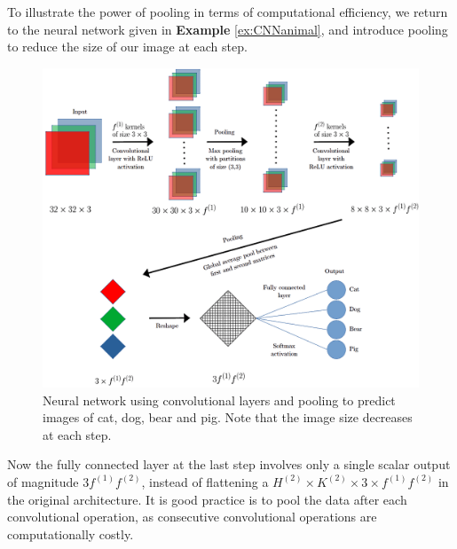 \begin{example}
To illustrate the power of pooling in terms of computational efficiency, we return to the neural network given in \textbf{Example} \ref{ex:CNNanimal}, and introduce pooling to reduce the size of our image at each step.
  \begin{figure}[H]
    \centering
    \includegraphics[scale=0.35]{images/Chapter 11/poolingNetwork.png}
    \caption{Neural network using convolutional layers and pooling to predict images of cat, dog, bear and pig. Note that the image size decreases at each step.}
    \label{fig:11.1}
\end{figure}
\noindent Now the fully connected layer at the last step involves only a single scalar output of magnitude $3f^{(1)}f^{(2)}$, instead of flattening a $H^{(2)} \times K^{(2)} \times 3 \times f^{(1)}f^{(2)}$ in the original architecture. It is good practice is to pool the data after each convolutional operation, as consecutive convolutional operations are computationally costly.
\end{example}

